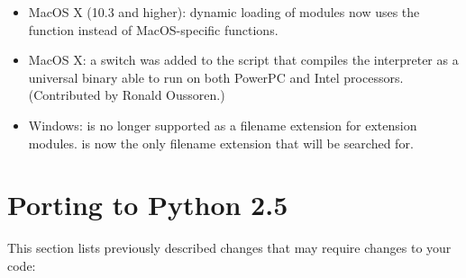 \documentclass{howto}
\begin{document}
\begin{itemize}

\item MacOS X (10.3 and higher): dynamic loading of modules
now uses the  function instead of MacOS-specific
functions.

\item MacOS X: a  switch was added
to the  script that compiles the interpreter as a
universal binary able to run on both PowerPC and Intel processors.
(Contributed by Ronald Oussoren.)

\item Windows:  is no longer supported as a filename extension for 
extension modules.   is now the only filename extension that will
be searched for.

\end{itemize}


\section{Porting to Python 2.5\label{porting}}

This section lists previously described changes that may require
changes to your code:
\end{document}
